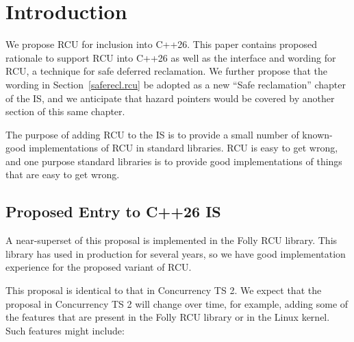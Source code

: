 
\chapter{Introduction}
\label{chp:Introduction}

We propose RCU for inclusion into C++26.
This paper contains proposed rationale to support RCU into C++26 as
well as the interface and wording for RCU, a technique for safe deferred
reclamation.
We further propose that the wording in Section~\ref{saferecl.rcu}
be adopted as a new ``Safe reclamation'' chapter of the IS, and we
anticipate that hazard pointers would be covered by another section of
this same chapter.

The purpose of adding RCU to the IS is to provide a small number of
known-good implementations of RCU in standard libraries.
RCU is easy to get wrong, and one purpose standard libraries is to
provide good implementations of things that are easy to get wrong.

\section{Proposed Entry to C++26 IS}
\label{sec:Proposed Entry to C++26 IS}

A near-superset of this proposal is implemented in the Folly RCU library.
This library has used in production for several years, so we have good
implementation experience for the proposed variant of RCU.

This proposal is identical to that in Concurrency TS 2.
We expect that the proposal in Concurrency TS 2 will change over
time, for example, adding some of the features that are present in
the Folly RCU library or in the Linux kernel.
Such features might include:

